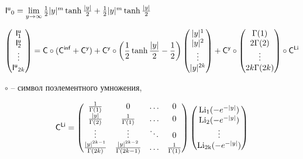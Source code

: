 \documentclass[a4paper,12pt]{article}
\begin{document}
\begin{center}
    $\mathsf{I^u}_0 = \lim\limits_{y\rightarrow \infty} {1\over{2}}|y|^m \operatorname{tanh}{|y|\over{2}} + {1\over{2}}|y|^m \operatorname{tanh}{|y|\over{2}}$
\end{center}

\begin{displaymath}
    \begin{pmatrix}
        \mathsf{I^u_1} \\ \mathsf{I^u_2} \\ \vdots \\ \mathsf{I^u}_{\mathsf{2}k} \\
    \end{pmatrix} = \mathsf{C} \circ (\mathsf{C^{inf}} + \mathsf{C^y}) + \mathsf{C^y} \circ \left({1\over{2}}\operatorname{tanh}{|y|\over{2}} - {1\over{2}}\right) \begin{pmatrix}
        |y|^1 \\ |y|^2 \\ \vdots \\ |y|^{\mathsf{2}k} \\
    \end{pmatrix} + \mathsf{C^y} \circ \begin{pmatrix}
        \Gamma(1) \\ 2\Gamma(2) \\ \vdots \\ 2k\Gamma(2k) \\
    \end{pmatrix} \circ \mathsf{C^{Li}} 
\end{displaymath}

 $\circ$ – символ поэлементного умножения,

\begin{displaymath}
    \mathsf{C^{Li}} =
    \begin{pmatrix}
        1\over{\Gamma(1)} & 0 & \ldots & 0 \\
        |y|\over{\Gamma(2)} & 1\over{\Gamma(1)} & \ldots & 0 \\
        \vdots & \vdots & \ddots & 0 \\
        |y|^{2k - 1}\over{\Gamma(2k)} & |y|^{2k - 2}\over{\Gamma(2k - 1)} & \ldots & 1\over{\Gamma(1)} \\
    \end{pmatrix} \begin{pmatrix}
        \operatorname{Li_1}(-e^{-|y|}) \\ \operatorname{Li_2}(-e^{-|y|}) \\ \vdots \\ \operatorname{Li_{2k}}(-e^{-|y|}) \\
    \end{pmatrix} 
\end{displaymath}

\begin{center}
    
\end{center}

\begin{center}
    
\end{center}
\end{document}
